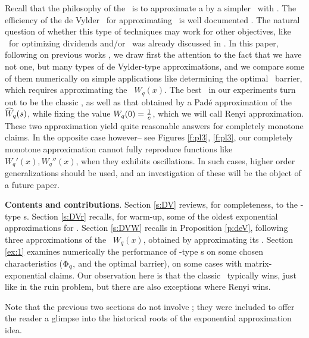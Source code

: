 Recall that the philosophy of the \deV\  is to approximate a \CLp by a simpler \proc\ with \expoj. The efficiency of the de Vylder \app\ for approximating \rps\ is well documented \cite{de1978practical}. The natural question of whether this type of techniques may work for other objectives, like \fe\ for optimizing dividends and/or \rei\ was already discussed  in \cite{hojgaard2002optimal,dickson2005optimal,beveridge2007optimal,GSS,AHPS}. In this paper, following on previous works \cite{avram2011moments,AP14,ABH}, we draw first the attention to the fact that  we have not one, but many types of de Vylder-type approximations, and we compare some of them numerically on simple applications like determining the optimal \divs\ barrier, which requires approximating the \sf\ $W_q(x)$. The best \app\ in our experiments turn out to be the classic \deV, as well
as that obtained by a Pad\'e approximation of the \LT\ $\widehat W_q(s)$, while fixing the value $W_q(0)=\frac 1 c$, which we will call Renyi approximation. These two approximation yield quite reasonable answers for completely monotone claims. In the opposite case however-- see \fe Figures \ref{f:pl3}, \ref{f:pl3}, our completely monotone approximation cannot fully reproduce functions like $W_q'(x), W_q''(x)$, when they exhibits oscillations.  In such cases,
 higher order generalizations should be used, and an investigation of these   will be the object of a future paper.

{\bf Contents and contributions}.
Section \ref{s:DV} reviews, for completeness, to the \deV-type \app s.  Section \ref{s:DVr} recalls, for warm-up, some of the oldest exponential approximations for \rps. Section \ref{s:DVW} recalls in Proposition \ref{p:deV}, following \cite{AP14,AHPS}  three approximations of the \sf\ $W_q(x)$, obtained by approximating its \LT.
Section \ref{ex:1} examines  numerically the performance of \deV-type \app s on some chosen characteristics ($\Phi_{q},$ and the optimal \deF barrier), on some cases with matrix-exponential claims.  Our observation here is that the classic \deV\ typically wins, just like in the ruin problem, but there are also exceptions  where Renyi wins.


Note that the previous two sections do not involve \ci; they were included to offer the reader a glimpse into  the historical roots  of the
exponential approximation idea.

